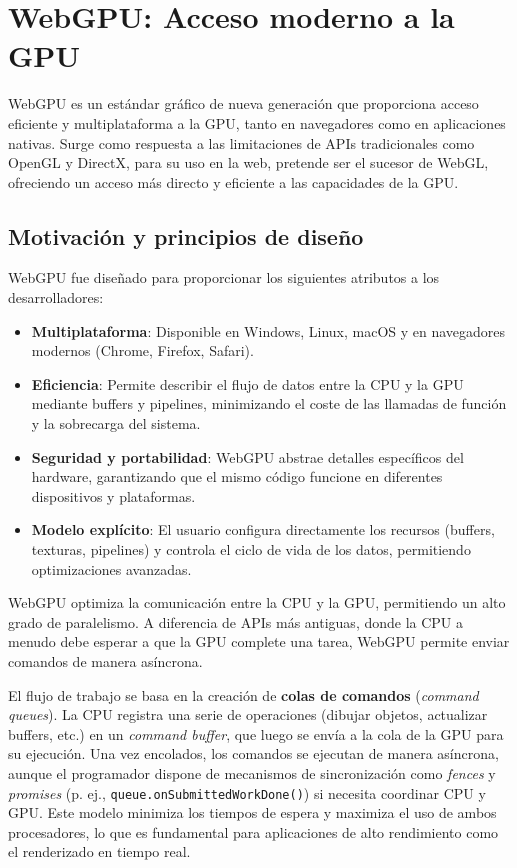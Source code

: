 \section{WebGPU: Acceso moderno a la GPU}

WebGPU es un estándar gráfico de nueva generación que proporciona acceso
eficiente y multiplataforma a la GPU, tanto en navegadores como en aplicaciones
nativas. Surge como respuesta a las limitaciones de APIs tradicionales como
OpenGL y DirectX, para su uso en la web, pretende ser el sucesor de WebGL,
ofreciendo un acceso más directo y eficiente a las capacidades de la GPU.

\subsection{Motivación y principios de diseño}

WebGPU fue diseñado para proporcionar los siguientes atributos a los
desarrolladores:

\begin{itemize}
    \item \textbf{Multiplataforma}: Disponible en Windows, Linux, macOS y en navegadores modernos (Chrome, Firefox, Safari).
    \item \textbf{Eficiencia}: Permite describir el flujo de datos entre la CPU y la GPU mediante buffers y pipelines, minimizando el coste de las llamadas de función y la sobrecarga del sistema.
    \item \textbf{Seguridad y portabilidad}: WebGPU abstrae detalles específicos del hardware, garantizando que el mismo código funcione en diferentes dispositivos y plataformas.
    \item \textbf{Modelo explícito}: El usuario configura directamente los recursos (buffers, texturas, pipelines) y controla el ciclo de vida de los datos, permitiendo optimizaciones avanzadas.
\end{itemize}

WebGPU optimiza la comunicación entre la CPU y la GPU, permitiendo un alto
grado de paralelismo. A diferencia de APIs más antiguas, donde la CPU a menudo
debe esperar a que la GPU complete una tarea, WebGPU permite enviar comandos de
manera asíncrona.

El flujo de trabajo se basa en la creación de \textbf{colas de comandos}
(\textit{command queues}). La CPU registra una serie de operaciones (dibujar
objetos, actualizar buffers, etc.) en un \textit{command buffer}, que luego se
envía a la cola de la GPU para su ejecución. Una vez encolados, los comandos se
ejecutan de manera asíncrona, aunque el programador dispone de mecanismos de
sincronización como \textit{fences} y \textit{promises} (p. ej.,
	\texttt{queue.onSubmittedWorkDone()}) si necesita coordinar CPU y GPU. Este
modelo minimiza los tiempos de espera y maximiza el uso de ambos procesadores,
lo que es fundamental para aplicaciones de alto rendimiento como el renderizado
en tiempo real.

